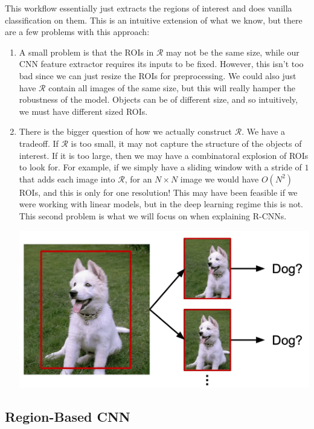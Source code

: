 \documentclass{article}
\begin{document}
  This workflow essentially just extracts the regions of interest and does vanilla classification on them. This is an intuitive extension of what we know, but there are a few problems with this approach: 
  \begin{enumerate}
    \item A small problem is that the ROIs in $\mathcal{R}$ may not be the same size, while our CNN feature extractor requires its inputs to be fixed. However, this isn't too bad since we can just resize the ROIs for preprocessing. We could also just have $\mathcal{R}$ contain all images of the same size, but this will really hamper the robustness of the model. Objects can be of different size, and so intuitively, we must have different sized ROIs. 

    \item There is the bigger question of how we actually construct $\mathcal{R}$. We have a tradeoff. If $\mathcal{R}$ is too small, it may not capture the structure of the objects of interest. If it is too large, then we may have a combinatoral explosion of ROIs to look for. For example, if we simply have a sliding window with a stride of $1$ that adds each image into $\mathcal{R}$, for an $N \times N$ image we would have $O(N^2)$ ROIs, and this is only for one resolution! This may have been feasible if we were working with linear models, but in the deep learning regime this is not. This second problem is what we will focus on when explaining R-CNNs. 
    
      \begin{center}
        \includegraphics[scale=0.3]{img/sliding_window.png}
      \end{center}
  \end{enumerate}

  \subsection{Region-Based CNN}
\end{document}
